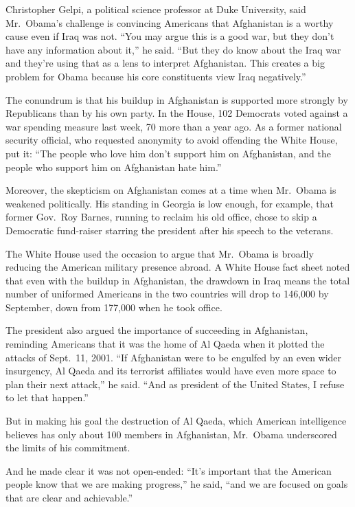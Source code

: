 ﻿\documentclass[12pt]{article}
\begin{document}
Christopher Gelpi, a political science professor at Duke University, said Mr.~Obama's challenge is
convincing Americans that Afghanistan is a worthy cause even if Iraq was not. ``You may argue this
is a good war, but they don't have any information about it,'' he said. ``But they do know about the
Iraq war and they're using that as a lens to interpret Afghanistan. This creates a big problem for
Obama because his core constituents view Iraq negatively.''

The conundrum is that his buildup in Afghanistan is supported more strongly by Republicans than by
his own party. In the House, 102 Democrats voted against a war spending measure last week, 70 more
than a year ago. As a former national security official, who requested anonymity to avoid offending
the White House, put it: ``The people who love him don't support him on Afghanistan, and the people
who support him on Afghanistan hate him.''

Moreover, the skepticism on Afghanistan comes at a time when Mr.~Obama is weakened politically. His
standing in Georgia is low enough, for example, that former Gov.~Roy Barnes, running to reclaim his
old office, chose to skip a Democratic fund-raiser starring the president after his speech to the
veterans.

The White House used the occasion to argue that Mr.~Obama is broadly reducing the American military
presence abroad. A White House fact sheet noted that even with the buildup in Afghanistan, the
drawdown in Iraq means the total number of uniformed Americans in the two countries will drop to
146,000 by September, down from 177,000 when he took office.

The president also argued the importance of succeeding in Afghanistan, reminding Americans that it
was the home of Al Qaeda when it plotted the attacks of Sept.~11, 2001. ``If Afghanistan were to be
engulfed by an even wider insurgency, Al Qaeda and its terrorist affiliates would have even more
space to plan their next attack,'' he said. ``And as president of the United States, I refuse to let
that happen.''

But in making his goal the destruction of Al Qaeda, which American intelligence believes has only
about 100 members in Afghanistan, Mr.~Obama underscored the limits of his commitment.

And he made clear it was not open-ended: ``It's important that the American people know that we are
making progress,'' he said, ``and we are focused on goals that are clear and achievable.''
\end{document}
